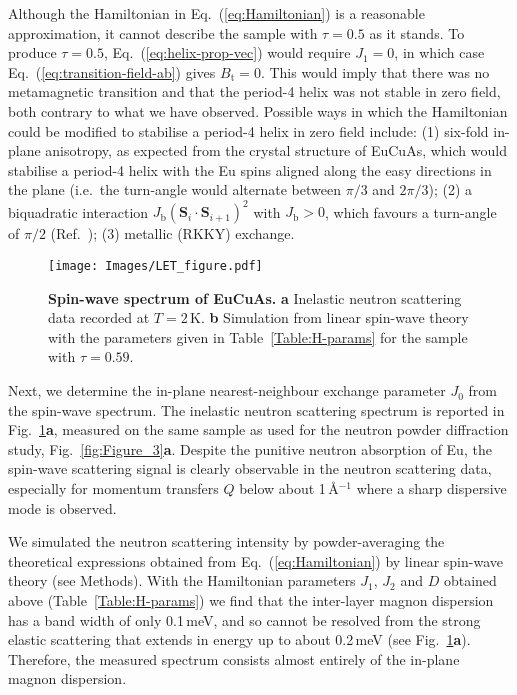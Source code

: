 \documentclass[aps,prl,amsmath,amssymb,amstext,citeautoscript,punctuation,nofootinbib,superscriptaddress,twocolumn]{revtex4-1}
\begin{document}
Although the Hamiltonian in Eq.~(\ref{eq:Hamiltonian}) is a reasonable approximation, it cannot describe the sample with $\tau = 0.5$ as it stands. To produce $\tau = 0.5$, Eq.~(\ref{eq:helix-prop-vec}) would require $J_1=0$, in which case Eq.~(\ref{eq:transition-field-ab}) gives $B_\textrm{t}=0$. This would imply that there was no metamagnetic transition and that the period-4 helix was not stable in zero field, both contrary to what we have observed. %
Possible ways in which the Hamiltonian could be modified to stabilise a period-4 helix in zero field include: (1) six-fold in-plane anisotropy, as expected from the crystal structure of EuCuAs, which would stabilise a period-4 helix with the Eu spins aligned along the easy directions in the plane (i.e.~the turn-angle would alternate between $\pi/3$ and $2\pi/3$); (2) a biquadratic interaction $J_\textrm{b}(\textbf{S}_i\cdot \textbf{S}_{i+1})^2$ with $J_\textrm{b} > 0$, which favours a turn-angle of $\pi/2$ (Ref.~); (3) metallic (RKKY) exchange. 

\begin{figure}[t!]
\texttt{[image: Images/LET\_figure.pdf]}
\caption{\label{fig:Figure_5} \textbf{Spin-wave spectrum of EuCuAs.} \textbf{a} Inelastic neutron scattering data recorded at $T = 2$\,K. \textbf{b} Simulation from linear spin-wave theory with the parameters given in Table~\ref{Table:H-params} for the sample with $\tau = 0.59$.}
\end{figure}

Next, we determine the in-plane nearest-neighbour exchange parameter $J_0$ from the spin-wave spectrum. The inelastic neutron scattering spectrum is reported in Fig.~\ref{fig:Figure_5}\textbf{a}, measured on the same sample as used for the neutron powder diffraction study, Fig.~\ref{fig:Figure_3}\textbf{a}. Despite the punitive neutron absorption of Eu, the spin-wave scattering signal is clearly observable in the neutron scattering data, especially for momentum transfers $Q$ below about 1\,\AA$^{-1}$ where a sharp dispersive mode is observed. 

We simulated the neutron scattering intensity by powder-averaging the theoretical expressions obtained from Eq.~(\ref{eq:Hamiltonian}) by linear spin-wave theory (see Methods). With the Hamiltonian parameters $J_1$, $J_2$ and $D$ obtained above (Table~\ref{Table:H-params}) we find that the inter-layer magnon dispersion has a band width of only 0.1\,meV, and so cannot be resolved from the strong elastic scattering that extends in energy up to about 0.2\,meV (see Fig.~\ref{fig:Figure_5}\textbf{a}). Therefore, the measured spectrum consists almost entirely of the in-plane magnon dispersion.  
\end{document}
